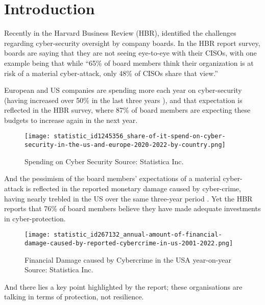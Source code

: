 \section{Introduction}

Recently in the Harvard Business Review (HBR), \textcite{Milica:2023} identified the challenges regarding cyber-security oversight by company
boards.   In the HBR report survey, boards are saying that they are not seeing eye-to-eye with their CISOs, with one example being that while
\enquote{65\% of board members think their organization is at risk of a material cyber-attack, only 48\% of CISOs share that view.}

European and US companies are spending more each year on cyber-security (having increased over 50\% in the last three years \autocite{Hiscox:2022}),
and that expectation is reflected in the HBR survey, where 87\% of board members are expecting these budgets to increase again in the next year.  

\begin{figure}[!ht] %
  \texttt{[image: statistic\_id1245356\_share-of-it-spend-on-cyber-security-in-the-us-and-europe-2020-2022-by-country.png]}\hfill
  \caption{Spending on Cyber Security  \autocite{Hiscox:2022}  Source: Statistica Inc.}
  \label{fig:cybersecurity-spending}
\end{figure}


And the pessimism of the board members' expectations of a material cyber-attack is reflected in the reported monetary damage caused by
cyber-crime, having nearly trebled in the US over the same three-year period \autocite{FBI:2023}.  Yet the HBR reports that 76\% of
board members believe they have made adequate investments in cyber-protection.

\begin{figure}[!ht] %
  \texttt{[image: statistic\_id267132\_annual-amount-of-financial-damage-caused-by-reported-cybercrime-in-us-2001-2022.png]}\hfill
  \caption{Financial Damage caused by Cybercrime in the USA year-on-year \autocite{FBI:2023} Source: Statistica Inc.}
  \label{fig:cybercrime-cost}
\end{figure}

And there lies a key point highlighted by the report; these organisations are talking in terms of protection, not resilience.

